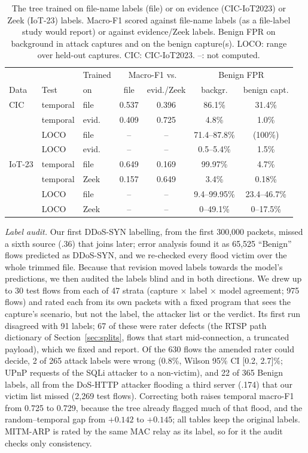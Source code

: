 \begin{table}[t]
\centering
\caption{The tree trained on file-name labels (file) or on evidence (CIC-IoT2023) or Zeek (IoT-23) labels. Macro-F1 scored against file-name labels (as a file-label study would report) or against evidence/Zeek labels. Benign FPR on background in attack captures and on the benign capture(s). LOCO: range over held-out captures. CIC: CIC-IoT2023. --: not computed.}
\label{tab:filelabel}
\footnotesize
\setlength{\tabcolsep}{2.6pt}
\begin{tabular}{lllcccc}
\hline
 & & Trained & \multicolumn{2}{c}{Macro-F1 vs.} & \multicolumn{2}{c}{Benign FPR} \\
Data & Test & on & file & evid./Zeek & backgr. & benign capt. \\
\hline
CIC & temporal & file  & 0.537 & 0.396 & 86.1\% & 31.4\% \\
            & temporal & evid. & 0.409 & 0.725 & 4.8\% & 1.0\% \\
            & LOCO     & file  & --    & --    & 71.4--87.8\% & (100\%) \\
            & LOCO     & evid. & --    & --    & 0.5--5.4\% & 1.5\% \\
\hline
IoT-23      & temporal & file  & 0.649 & 0.169 & 99.97\% & 4.7\% \\
            & temporal & Zeek  & 0.157 & 0.649 & 3.4\% & 0.18\% \\
            & LOCO     & file  & --    & --    & 9.4--99.95\% & 23.4--46.7\% \\
            & LOCO     & Zeek  & --    & --    & 0--49.1\% & 0--17.5\% \\
\hline
\end{tabular}
\end{table}

\emph{Label audit.} Our first DDoS-SYN labelling, from the first 300,000 packets, missed a sixth source (.36) that joins later; error analysis found it as 65,525 ``Benign'' flows predicted as DDoS-SYN, and we re-checked every flood victim over the whole trimmed file. Because that revision moved labels towards the model's predictions, we then audited the labels blind and in both directions. We drew up to 30 test flows from each of 47 strata (capture $\times$ label $\times$ model agreement; 975 flows) and rated each from its own packets with a fixed program that sees the capture's scenario, but not the label, the attacker list or the verdict. Its first run disagreed with 91 labels; 67 of these were rater defects (the RTSP path dictionary of Section~\ref{sec:splits}, flows that start mid-connection, a truncated payload), which we fixed and report. Of the 630 flows the amended rater could decide, 2 of 265 attack labels were wrong (0.8\%, Wilson 95\% CI [0.2, 2.7]\%; UPnP requests of the SQLi attacker to a non-victim), and 22 of 365 Benign labels, all from the DoS-HTTP attacker flooding a third server (.174) that our victim list missed (2,269 test flows). Correcting both raises temporal macro-F1 from 0.725 to 0.729, because the tree already flagged much of that flood, and the random--temporal gap from $+0.142$ to $+0.145$; all tables keep the original labels. MITM-ARP is rated by the same MAC relay as its label, so for it the audit checks only consistency.

